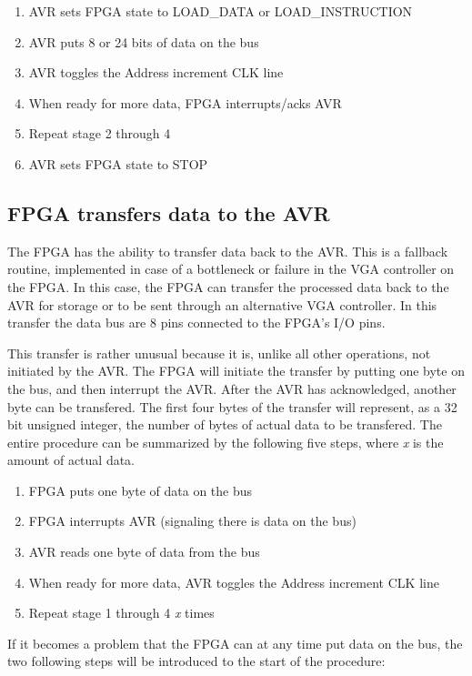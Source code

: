 \begin{enumerate}
\item AVR sets FPGA state to LOAD\_DATA or LOAD\_INSTRUCTION
\item AVR puts 8 or 24 bits of data on the bus
\item AVR toggles the Address increment CLK line
\item When ready for more data, FPGA interrupts/acks AVR 
\item Repeat stage 2 through 4
\item AVR sets FPGA state to STOP
\end{enumerate}

\subsection{FPGA transfers data to the AVR}
The FPGA has the ability to transfer data back to the AVR. This is a fallback routine, implemented in case of a bottleneck or failure in the VGA controller on the FPGA. In this case, the FPGA can transfer the processed data back to the AVR for storage or to be sent through an alternative VGA controller. In this transfer the data bus are 8 pins connected to the FPGA's I/O pins.

This transfer is rather unusual because it is, unlike all other operations, not initiated by the AVR. The FPGA will initiate the transfer by putting one byte on the bus, and then interrupt the AVR. After the AVR has acknowledged, another byte can be transfered. The first four bytes of the transfer will represent, as a 32 bit unsigned integer, the number of bytes of actual data to be transfered. The entire procedure can be summarized by the following five steps, where \emph{x} is the amount of actual data.

\begin{enumerate}
\item FPGA puts one byte of data on the bus
\item FPGA interrupts AVR (signaling there is data on the bus)
\item AVR reads one byte of data from the bus
\item When ready for more data, AVR toggles the Address increment CLK line
\item Repeat stage 1 through 4 \emph{x} times
\end{enumerate}

If it becomes a problem that the FPGA can at any time put data on the bus, the two following steps will be introduced to the start of the procedure: 

